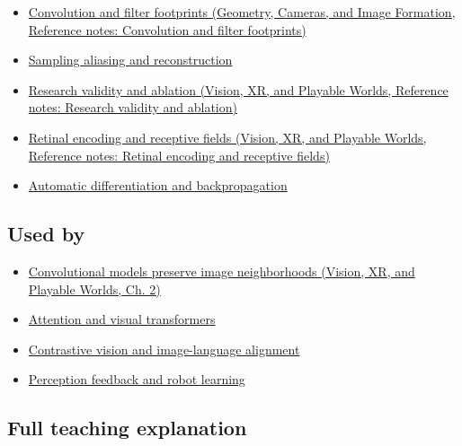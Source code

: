 \hypertarget{appendix-47c51ea026fb-prerequisites}{}

\begin{itemize}
\tightlist
\item
  \href{../03-Geometry-Cameras-and-Image-Formation/main.pdf\#nameddest=appendix-d5b3c692d9f0}{Convolution and filter footprints (Geometry, Cameras, and Image Formation, Reference notes: Convolution and filter footprints)}
\item
  \hyperref[appendix-6a7869dd79a6]{Sampling aliasing and reconstruction}
\item
  \href{../07-Vision-XR-and-Playable-Worlds/main.pdf\#nameddest=appendix-65788587ef78}{Research validity and ablation (Vision, XR, and Playable Worlds, Reference notes: Research validity and ablation)}
\item
  \href{../07-Vision-XR-and-Playable-Worlds/main.pdf\#nameddest=appendix-7281c15ac44a}{Retinal encoding and receptive fields (Vision, XR, and Playable Worlds, Reference notes: Retinal encoding and receptive fields)}
\item
  \hyperref[appendix-40df0855b4a7]{Automatic differentiation and backpropagation}
\end{itemize}

\subsection{Used by}\label{appendix-47c51ea026fb-used-by}

\hypertarget{appendix-47c51ea026fb-used-by}{}

\begin{itemize}
\tightlist
\item
  \href{../07-Vision-XR-and-Playable-Worlds/main.pdf\#nameddest=04-visual-computing-ii-ch031-convolutional-models-preserve-image-neighborhoods}{Convolutional models preserve image neighborhoods (Vision, XR, and Playable Worlds, Ch. 2)}
\item
  \hyperref[appendix-a9d5dfdd164a]{Attention and visual transformers}
\item
  \hyperref[appendix-772f1fd96148]{Contrastive vision and image-language alignment}
\item
  \hyperref[appendix-b0c42da325f1]{Perception feedback and robot learning}
\end{itemize}

\subsection{Full teaching explanation}\label{appendix-47c51ea026fb-full-teaching-explanation}

